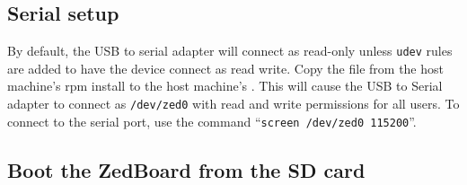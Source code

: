 \subsection*{Serial setup}
By default, the USB to serial adapter will connect as read-only unless \texttt{udev} rules are added to have the device connect as read write.  Copy the file from the host machine's rpm install  to the host machine's .  This will cause the USB to Serial adapter to connect as \texttt{/dev/zed0} with read and write permissions for all users.  To connect to the serial port, use the command ``\texttt{screen /dev/zed0 115200}''.
\newpage
\subsection*{Boot the ZedBoard from the SD card}
